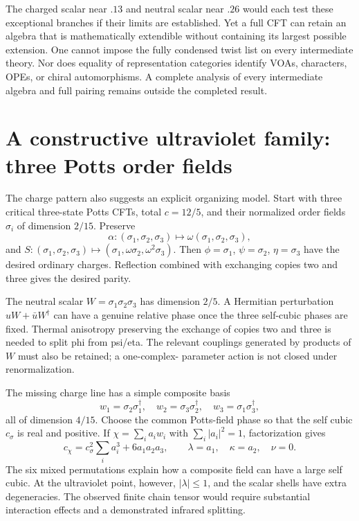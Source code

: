 The charged scalar near $.13$ and neutral scalar near $.26$
would each test these exceptional branches if their limits are
established. Yet a full CFT can retain an algebra that is
mathematically extendible without containing its largest possible
extension. One cannot impose the fully condensed twist list on
every intermediate theory. Nor does equality of representation
categories identify VOAs, characters, OPEs, or chiral
automorphisms. A complete analysis of every intermediate algebra
and full pairing remains outside the completed result.

\section{A constructive ultraviolet family: three Potts order fields}

The charge pattern also suggests an explicit organizing model. Start
with three critical three-state Potts CFTs, total $c=12/5$, and their
normalized order fields $\sigma_i$ of dimension $2/15$. Preserve
\[
 \alpha:(\sigma_1,\sigma_2,\sigma_3)
       \mapsto\omega(\sigma_1,\sigma_2,\sigma_3),
\]
and
$S:(\sigma_1,\sigma_2,\sigma_3)
\mapsto(\sigma_1,\omega\sigma_2,\omega^2\sigma_3)$.
Then $\phi=\sigma_1$, $\psi=\sigma_2$, $\eta=\sigma_3$ have the
desired ordinary charges. Reflection combined with exchanging
copies two and three gives the desired parity.

The neutral scalar $W=\sigma_1\sigma_2\sigma_3$ has dimension
$2/5$. A Hermitian perturbation $uW+\bar uW^\dagger$ can have a
genuine relative phase once the three self-cubic phases are fixed.
Thermal anisotropy preserving the exchange of copies two and three
is needed to split phi from psi/eta. The relevant couplings
generated by products of $W$ must also be retained; a one-complex-
parameter action is not closed under renormalization.

The missing charge line has a simple composite basis
\[
 w_1=\sigma_2\sigma_1^\dagger,\quad
 w_2=\sigma_3\sigma_2^\dagger,\quad
 w_3=\sigma_1\sigma_3^\dagger,
\]
all of dimension $4/15$. Choose the common Potts-field phase so that
the self cubic $c_\sigma$ is real and positive. If
$\chi=\sum_ia_iw_i$ with $\sum_i|a_i|^2=1$, factorization gives
\[
 c_\chi=c_\sigma^2\sum_ia_i^3+6a_1a_2a_3,
 \qquad\lambda=a_1,\quad\kappa=a_2,\quad\nu=0.
\]
The six mixed permutations explain how a composite field can have
a large self cubic. At the ultraviolet point, however,
$|\lambda|\leq1$, and the scalar shells have extra degeneracies.
The observed finite chain tensor would require substantial
interaction effects and a demonstrated infrared splitting.

